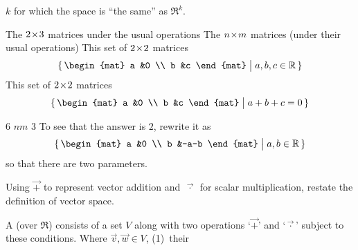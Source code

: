\begin{exercises}
    \( k \) for which the space is ``the same'' as \( \Re^k \).
    \begin{exparts}
      \partsitem The \( 2 \! \times \! 3 \) matrices under the usual operations
      \partsitem The \( n \! \times \! m \) matrices (under their usual operations)
      \partsitem This set of \( 2 \! \times \! 2 \) matrices
        \begin{equation*}
          \set{\begin{mat}
            a  &0  \\
            b  &c
          \end{mat} \suchthat a,b,c\in\Re}
        \end{equation*}
      \partsitem This set of \( 2 \! \times \! 2 \) matrices
        \begin{equation*}
          \set{\begin{mat}
            a  &0  \\
            b  &c
          \end{mat} \suchthat a+b+c=0}
        \end{equation*}
    \end{exparts}
    \begin{answer}
      \begin{exparts}
        \partsitem \( 6 \)
        \partsitem \( nm \)
        \partsitem \( 3 \)
        \partsitem To see that the answer is \( 2 \), rewrite it as
        \begin{equation*}
          \set{\begin{mat}
            a  &0  \\
            b  &-a-b
          \end{mat} \suchthat a,b\in\Re}
        \end{equation*}
        so that there are two parameters.
      \end{exparts}  
     \end{answer}
  \recommended \item 
    Using \( \vec{+} \) to represent vector addition
    and \( \,\vec{\cdot}\, \) for scalar multiplication,
    restate the definition of vector space.
    \begin{answer}
      {
      \def\plus{\mathbin{\vec{+}}}
      \def\tim{\mathbin{\vec{\cdot}}}
        A 
        (over \( \Re \)) consists of a set \( V \) along with
        two operations `\( \plus \)' and `\( \tim \)' subject to these 
        conditions.
        Where \( \vec{v},\vec{w}\in V \), 
        (1)~their 
}
\end{answer}
\end{exercises}
